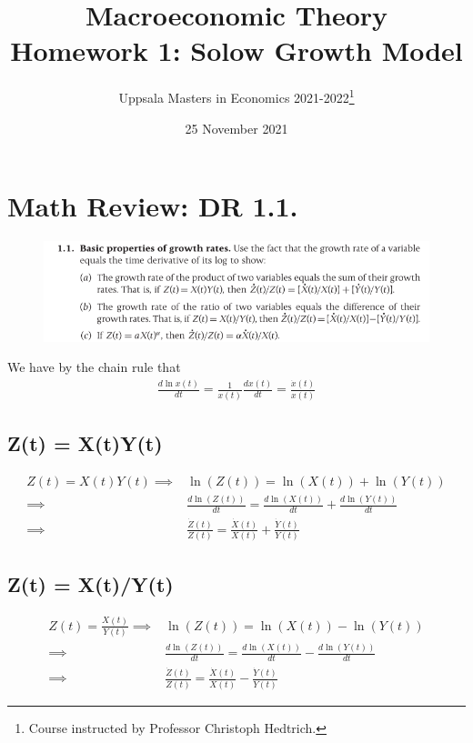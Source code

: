 \documentclass{article}
\title{ Macroeconomic Theory \\
        Homework 1: Solow Growth Model
        }
\author{
        Uppsala Masters in Economics 2021-2022\thanks{Course instructed by Professor Christoph Hedtrich.}
        }
\date{25 November 2021}
\begin{document}
    \maketitle
    
    \section{Math Review: DR 1.1.}
        
        \begin{figure}[h!]
            \centering
            \includegraphics[width=\textwidth]{./HW1-DR1.1.png}
        \end{figure}
        
        We have by the chain rule that
        \begin{align}
            \frac{ d\ln{x(t)} }{ dt } = \frac{ 1 }{ x(t) } \frac{ dx(t) }{ dt } = \frac{ \dot{x}(t) }{ x(t) }
        \end{align}
        
    
    \subsection{Z(t) = X(t)Y(t)}
    
        \begin{align*}
            Z(t) = X(t)Y(t)
            \implies&
            \ln(Z(t)) = \ln(X(t)) + \ln(Y(t))
            \\ \implies&
            \frac{ d \ln(Z(t)) }{ dt }
            = \frac{ d\ln(X(t)) }{ dt } + \frac{ d\ln(Y(t)) }{ dt }
            \\ \implies&
            \frac{ \dot{Z}(t) }{ Z(t) }
            = \frac{ \dot{X}(t) }{ X(t) } + \frac{ \dot{Y}(t) }{ Y(t) }
        \end{align*}
    
    \subsection{Z(t) = X(t)/Y(t)}
        
        \begin{align*}
            Z(t) = \frac{X(t)}{Y(t)}
            \implies&
            \ln(Z(t)) = \ln(X(t)) - \ln(Y(t))
            \\ \implies&
            \frac{ d \ln(Z(t)) }{ dt }
            = \frac{ d\ln(X(t)) }{ dt } - \frac{ d\ln(Y(t)) }{ dt }
            \\ \implies&
            \frac{ \dot{Z}(t) }{ Z(t) }
            = \frac{ \dot{X}(t) }{ X(t) } - \frac{ \dot{Y}(t) }{ Y(t) }
        \end{align*}
        
\end{document}
